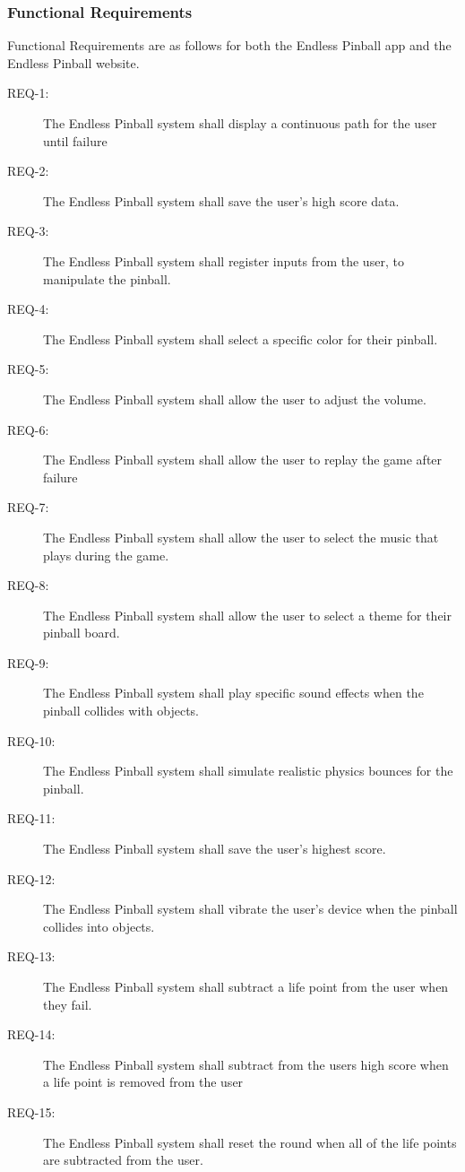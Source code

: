 \documentclass[11pt]{article}
\begin{document}
\subsubsection{Functional Requirements}
\label{sec:org16aa4b3}
Functional Requirements are as follows for both the Endless Pinball app and the Endless Pinball website. 
\begin{description}
\item[{REQ-1:}] The Endless Pinball system shall display a continuous path for the user until failure
\item[{REQ-2:}] The Endless Pinball system shall save the user’s high score data.
\item[{REQ-3:}] The Endless Pinball system shall register inputs from the user, to manipulate the pinball.
\item[{REQ-4:}] The Endless Pinball system shall select a specific color for their pinball.
\item[{REQ-5:}] The Endless Pinball system shall allow the user to adjust the volume.
\item[{REQ-6:}] The Endless Pinball system shall allow the user to replay the game after failure
\item[{REQ-7:}] The Endless Pinball system shall allow the user to select the music that plays during the game.
\item[{REQ-8:}] The Endless Pinball system shall allow the user to select a theme for their pinball board.
\item[{REQ-9:}] The Endless Pinball system shall play specific sound effects when the pinball collides with objects.
\item[{REQ-10:}] The Endless Pinball system shall simulate realistic physics bounces for the pinball.
\item[{REQ-11:}] The Endless Pinball system shall save the user’s highest score.
\item[{REQ-12:}] The Endless Pinball system shall vibrate the user’s device when the pinball collides into objects.
\item[{REQ-13:}] The Endless Pinball system shall subtract a life point from the user when they fail.
\item[{REQ-14:}] The Endless Pinball system shall subtract from the users high score when a life point is removed from the user
\item[{REQ-15:}] The Endless Pinball system shall reset the round when all of the life points are subtracted from the user.
\end{description}
\end{document}
